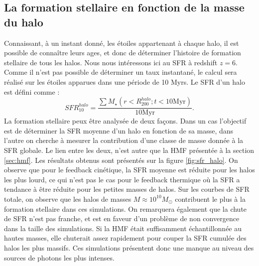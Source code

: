 \subsection{La formation stellaire en fonction de la masse du halo}
\label{sec:sfr_halo}
Connaissant, à un instant donné, les étoiles appartenant à chaque halo, il est possible de connaître leurs ages, et donc de déterminer l'histoire de formation stellaire de tous les halos.
Nous nous intéressons ici au \ac{SFR} à redshift $z=6$.
Comme il n'est pas possible de déterminer un taux instantané, le calcul sera réalisé sur les étoiles apparues dans une période de 10 Myrs.
Le \ac{SFR} d'un halo est défini comme :
\begin{equation}
	SFR_{10}^{halo} = \frac{ \sum M_{\star} \left( r<R_{200}^{halo}; t<10\mathrm{Myr}\right) }{10\mathrm{Myr}}.
\end{equation}
La formation stellaire peux être analysée de deux façons.
Dans un cas l'objectif est de déterminer la \ac{SFR} moyenne d'un halo en fonction de sa masse, dans l'autre on cherche à mesurer la contribution d'une classe de masse donnée à la \ac{SFR} globale.
Le lien entre les deux, n'est autre que la \ac{HMF} présentée à la section \ref{sec:hmf}.
Les résultats obtenus sont présentés sur la figure \ref{fig:sfr_halo}.
On observe que pour le feedback cinétique, la \ac{SFR} moyenne est réduite pour les halos les plus lourd, ce qui n'est pas le cas pour le feedback thermique où la \ac{SFR} a tendance à être réduite pour les petites masses de halos.
Sur les courbes de \ac{SFR} totale, on observe que les halos de masses $M\approx10^{10}M_\odot$ contribuent le plus à la formation stellaire dans ces simulations.
On remarquera également que la chute de \ac{SFR} n'est pas franche, et est en faveur d'un problème de non convergence dans la taille des simulations.
Si la \ac{HMF} était suffisamment échantillonnée au hautes masses, elle chuterait assez rapidement pour couper la \ac{SFR} cumulée des halos les plus massifs.
Ces simulations présentent donc une manque au niveau des sources de photons les plus intenses.

